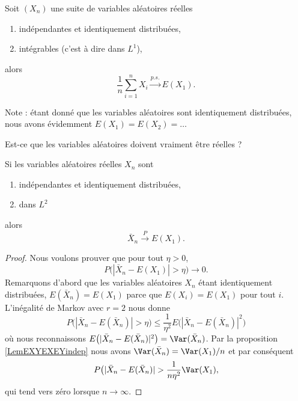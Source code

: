 \begin{theorem}     \label{ThoefQyKZ}
    Soit \( (X_n)\) une suite de variables aléatoires réelles
    \begin{enumerate}
        \item
            indépendantes et identiquement distribuées,
        \item
            intégrables (c'est à dire dans \( L^1\)),
    \end{enumerate}
    alors
    \begin{equation}
        \frac{1}{ n }\sum_{i=1}^nX_i  \stackrel{p.s.}{\longrightarrow} E(X_1).
    \end{equation}
\end{theorem}
Note : étant donné que les variables aléatoires sont identiquement distribuées, nous avons évidemment \( E(X_1)=E(X_2)=\ldots\)

\begin{probleme}
    Est-ce que les variables aléatoires doivent vraiment être réelles ?
\end{probleme}

\begin{corollary}
    Si les variables aléatoires réelles \( X_n\) sont
    \begin{enumerate}
        \item
            indépendantes et identiquement distribuées,
        \item
            dans \( L^2\)
    \end{enumerate}
    alors
    \begin{equation}
        \bar X_n\stackrel{P}{\longrightarrow}E(X_1).
    \end{equation}
\end{corollary}

\begin{proof}
    Nous voulons prouver que pour tout \( \eta>0\),
    \begin{equation}
        P\big( | \bar X_n-E(X_1) |>\eta \big)\to 0.
    \end{equation}
    Remarquons d'abord que les variables aléatoires \( X_n\) étant identiquement distribuées, \( E(\bar X_n)=E(X_1)\) parce que \( E(X_i)=E(X_1)\) pour tout \( i\). L'inégalité de Markov avec \( r=2\) nous donne
    \begin{equation}
        P\big( | \bar X_n-E(\bar X_n) |>\eta \big)\leq\frac{1}{ \eta^2 }E\big( | \bar X_n-E(\bar X_n) |^2 \big)
    \end{equation}
    où nous reconnaissons \( E\big( | \bar X_n-E(\bar X_n) |^2 \big)=\Var(\bar X_n)\). Par la proposition \ref{LemEXYEXEYindep} nous avons \( \Var(\bar X_n)=\Var(X_1)/n\) et par conséquent
    \begin{equation}
        P\big( | \bar X_n-E(\bar X_n) |>\frac{1}{ n\eta^2 }\Var(X_1),
    \end{equation}
    qui tend vers zéro lorsque \( n\to\infty\).
\end{proof}

